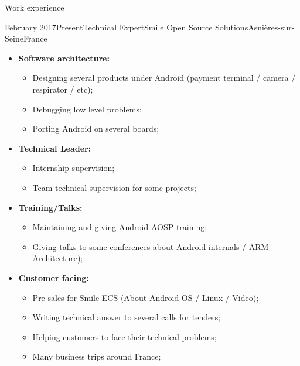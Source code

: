\documentclass[a4paper, 10pt]{article}
\begin{document}
\begin{section} {Work experience}
    \begin{experience}{February 2017}{Present}{Technical Expert}{Smile Open Source Solutions}{Asni\`{e}res-sur-Seine}{France}
    \begin{subexperience}
    \begin{itemize}[parsep=0cm,itemsep=0cm,topsep=0cm]
		\item \textbf {Software architecture:}
		\begin{itemize}[parsep=0cm,itemsep=0cm,topsep=0cm]
			\item Designing several products under Android (payment terminal / camera / respirator / etc);
			\item Debugging low level problems;
			\item Porting Android on several boards;
		\end{itemize}
		\item \textbf {Technical Leader:}
		\begin{itemize}[parsep=0cm,itemsep=0cm,topsep=0cm]
			\item Internship supervision;
			\item Team technical supervision for some projects;
		\end{itemize}
		\item \textbf {Training/Talks:}
		\begin{itemize}[parsep=0cm,itemsep=0cm,topsep=0cm]
			\item Maintaining and giving Android AOSP training;
			\item Giving talks to some conferences about Android internals / ARM Architecture);
		\end{itemize}
		\item \textbf {Customer facing:}
		\begin{itemize}[parsep=0cm,itemsep=0cm,topsep=0cm]
			\item Pre-sales for Smile ECS (About Android OS / Linux / Video);
			\item Writing technical answer to several calls for tenders;
			\item Helping customers to face their technical problems;
			\item Many business trips around France;
		\end{itemize}
	\end{itemize}
	\end{subexperience}
	\end{experience}


\end{section}
\end{document}
